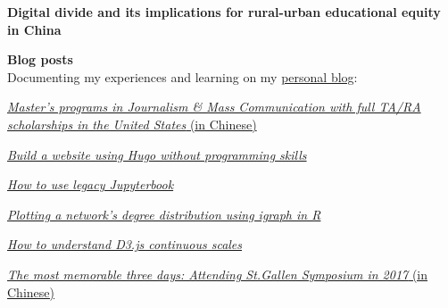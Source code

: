 

\begin{cventries}

\begin{rSection}{}
{\vspace{-0.5em}\hspace{-1.5em}}{\bodyfont\bfseries\color{darktext} {Digital divide and its implications for rural-urban educational equity in China \hspace{1em} \href{https://hongtaoh.com/cn/2020/10/30/dd-china/}{\large{\faGlobe}} \hspace{1em} \href{https://hongtaoh.com/files/Digital_Divide_China.pdf}{\faFile}}}
\vspace{-0.3em}
\end{rSection}

\begin{rSection}{}
{\hspace{-1.5em}}{\bodyfont\bfseries\color{darktext} {Blog posts}}
\\\hspace{-1.2em} Documenting my experiences and learning on my \href{https://hongtaoh.com/en/blog/}{personal blog}: \vspace{0.6em}
      \begin{cvitems} %
        \item {\href{https://hongtaoh.com/cn/2020/02/01/us-communication-ma-programs/}{\textit{Master's programs in Journalism \& Mass Communication with full TA/RA scholarships in the United States }(in Chinese)}}
        \item {\href{https://hongtaoh.com/en/2020/06/05/get-started-with-hugo/}{\textit{Build a website using Hugo without programming skills}}}
        \item {\href{https://hongtaoh.com/en/2020/07/25/legacy-jupyterbook/}{\textit{How to use legacy Jupyterbook}}}
        \item {\href{https://hongtaoh.com/en/2020/08/19/plot-degree-distribution-using-igraph/}{\textit{Plotting a network's degree distribution using igraph in R}}}
        \item {\href{https://hongtaoh.com/en/2020/09/07/d3-scales/}{\textit{How to understand D3.js continuous scales}}}
        \item {\href{https://hongtaoh.com/cn/2020/01/17/2017-st.gallen-memory/}{\textit{The most memorable three days: Attending St.Gallen Symposium in 2017 }(in Chinese)}}
      \end{cvitems}
\vspace{1em}
\end{rSection}

\end{cventries}
